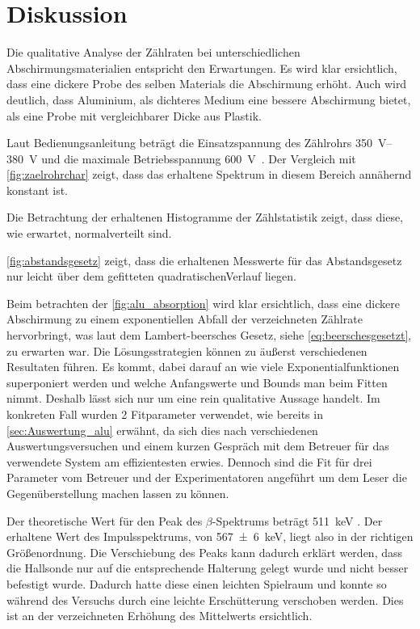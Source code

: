 \documentclass[12pt,english,ngerman]{scrartcl}
\begin{document}
\section{Diskussion}\label{sec:diskussion}

Die qualitative Analyse der Zählraten bei unterschiedlichen
Abschirmungsmaterialien entspricht den Erwartungen. Es wird klar ersichtlich,
dass eine dickere Probe des selben Materials die Abschirmung erhöht. Auch wird
deutlich, dass Aluminium, als dichteres Medium eine bessere Abschirmung bietet,
als eine Probe mit vergleichbarer Dicke aus Plastik.

Laut Bedienungsanleitung beträgt die Einsatzspannung des Zählrohrs
\SIrange{350}{380}{\volt} und die maximale Betriebsspannung
\SI{600}{\volt}~\cite{zaehlrohrdoku}. Der Vergleich mit
\autoref{fig:zaelrohrchar} zeigt, dass das erhaltene Spektrum in diesem Bereich
annähernd konstant ist.

Die Betrachtung der erhaltenen Histogramme der Zählstatistik zeigt, dass diese,
wie erwartet, normalverteilt sind.

\autoref{fig:abstandsgesetz} zeigt, dass die erhaltenen Messwerte für das Abstandsgesetz nur leicht über dem gefitteten
quadratischenVerlauf liegen.

Beim betrachten der \autoref{fig:alu_absorption} wird klar ersichtlich, dass
eine dickere Abschirmung zu einem exponentiellen Abfall der verzeichneten
Zählrate hervorbringt, was laut dem Lambert-beersches Gesetz, siehe
\autoref{eq:beerschesgesetzt}, zu erwarten war. Die Lösungsstrategien können zu
äußerst verschiedenen Resultaten führen. Es kommt, dabei darauf an wie viele
Exponentialfunktionen superponiert werden und welche Anfangswerte und Bounds
man beim Fitten nimmt. Deshalb lässt sich nur um eine rein qualitative Aussage
handelt. Im konkreten Fall wurden 2 Fitparameter verwendet, wie bereits in
\autoref{sec:Auswertung_alu} erwähnt, da sich dies nach verschiedenen
Auswertungsversuchen und einem kurzen Gespräch mit dem Betreuer für das
verwendete System am effizientesten erwies. Dennoch sind die Fit für drei
Parameter vom Betreuer und der Experimentatoren angeführt um dem Leser die
Gegenüberstellung machen lassen zu können.


Der theoretische Wert für den Peak des $\beta$-Spektrums beträgt
\SI{511}{\kilo\electronvolt} \cite[]{leifi}. Der erhaltene Wert des
Impulsspektrums, von \SI{567(6)}{\kilo\electronvolt}, liegt also in der
richtigen Größenordnung. Die Verschiebung des Peaks kann dadurch erklärt
werden, dass die Hallsonde nur auf die entsprechende Halterung gelegt wurde und
nicht besser befestigt wurde. Dadurch hatte diese einen leichten Spielraum und
konnte so während des Versuchs durch eine leichte Erschütterung verschoben
werden. Dies ist an der verzeichneten Erhöhung des Mittelwerts ersichtlich.
\end{document}

